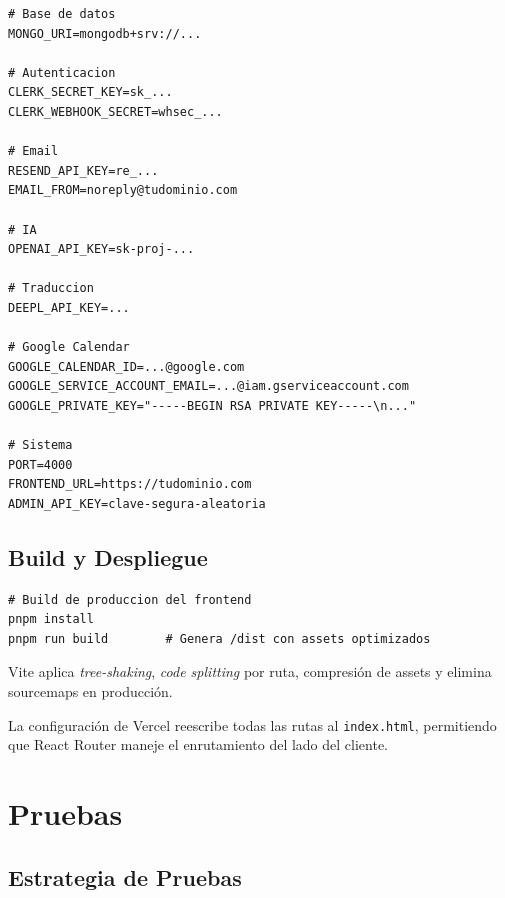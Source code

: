 \documentclass[12pt, a4paper, twoside]{report}
\begin{document}
\begin{tcolorbox}[codebox]
\begin{lstlisting}[style=env, numbers=none]
# Base de datos
MONGO_URI=mongodb+srv://...

# Autenticacion
CLERK_SECRET_KEY=sk_...
CLERK_WEBHOOK_SECRET=whsec_...

# Email
RESEND_API_KEY=re_...
EMAIL_FROM=noreply@tudominio.com

# IA
OPENAI_API_KEY=sk-proj-...

# Traduccion
DEEPL_API_KEY=...

# Google Calendar
GOOGLE_CALENDAR_ID=...@google.com
GOOGLE_SERVICE_ACCOUNT_EMAIL=...@iam.gserviceaccount.com
GOOGLE_PRIVATE_KEY="-----BEGIN RSA PRIVATE KEY-----\n..."

# Sistema
PORT=4000
FRONTEND_URL=https://tudominio.com
ADMIN_API_KEY=clave-segura-aleatoria
\end{lstlisting}
\end{tcolorbox}

\section{Build y Despliegue}

\begin{tcolorbox}[codebox]
\begin{lstlisting}[style=bash, numbers=none]
# Build de produccion del frontend
pnpm install
pnpm run build        # Genera /dist con assets optimizados
\end{lstlisting}
\end{tcolorbox}

Vite aplica \textit{tree-shaking}, \textit{code splitting} por ruta, compresión de assets y
elimina sourcemaps en producción.

La configuración de Vercel reescribe todas las rutas al \texttt{index.html}, permitiendo que
React Router maneje el enrutamiento del lado del cliente.

\clearpage
\chapter{Pruebas}

\section{Estrategia de Pruebas}
\end{document}

